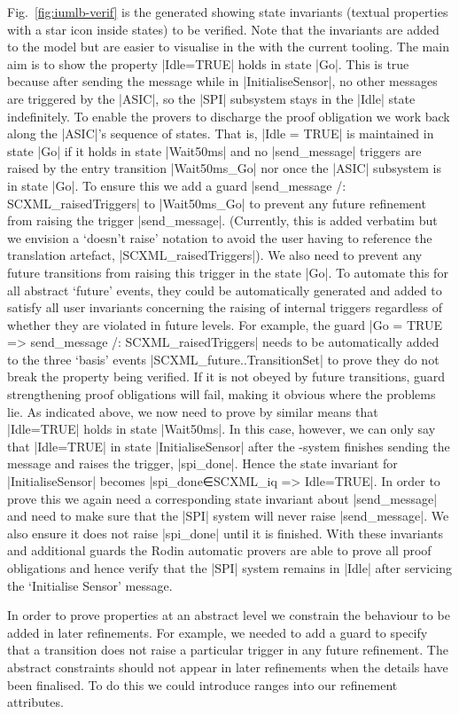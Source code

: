 Fig.~\ref{fig:iumlb-verif} is the generated \iUMLB showing state invariants (textual properties with a star icon inside states) to be verified. Note that the invariants are added to the \SCXML model but are easier to visualise in the \iUMLB with the current tooling.
The main aim is to show the property |Idle=TRUE| holds in state |Go|. 
This is true because after sending the message while in |InitialiseSensor|, no other messages are triggered by the |ASIC|, so the |SPI| subsystem stays in the |Idle| state indefinitely. 
To enable the provers to discharge the proof obligation we work back along the |ASIC|'s sequence of states. 
That is, |Idle = TRUE| is maintained in state |Go| if it holds in state |Wait50ms| and no |send_message| triggers are raised by the entry transition |Wait50ms_Go| nor once the |ASIC| subsystem is in state |Go|. 
To ensure this we add a guard |send_message /: SCXML_raisedTriggers| to |Wait50ms_Go| to prevent any future refinement from raising the trigger |send_message|.
(Currently, this is added verbatim but we envision a `doesn't raise' notation to avoid the user having to reference the translation artefact, |SCXML_raisedTriggers|).
We also need to prevent any future transitions from raising this trigger in the state |Go|.
To automate this for all abstract `future' events, they could be automatically generated and added to satisfy all user invariants concerning the raising of internal triggers regardless of whether they are violated in future levels. 
For example, the guard  |Go = TRUE => send_message /: SCXML_raisedTriggers| needs to be automatically added to the three `basis' events |SCXML_future..TransitionSet| to prove they do not break the property being verified. 
If it is not obeyed by future transitions, guard strengthening proof obligations will fail, making it obvious where the problems lie.
As indicated above, we now need to prove by similar means that |Idle=TRUE| holds in state |Wait50ms|. 
In this case, however, we can only say that |Idle=TRUE| in state |InitialiseSensor| after the \SPI-system finishes sending the message and raises the trigger, |spi_done|. 
Hence the state invariant for |InitialiseSensor| becomes |spi_done∈SCXML_iq => Idle=TRUE|. 
In order to prove this we again need a corresponding state invariant about |send_message| and need to make sure that the |SPI| system will never raise |send_message|.
We also ensure it does not raise |spi_done| until it is finished. 
With these invariants and additional guards the Rodin automatic provers are able to prove all proof obligations and hence verify that the |SPI| system remains in |Idle| after servicing the `Initialise Sensor' message.

In order to prove properties at an abstract level we constrain the behaviour to be added in later refinements. 
For example, we needed to add a guard to specify that a transition does not raise a particular trigger in any future refinement. 
The abstract constraints should not appear in later refinements when the details have been finalised. To do this we could introduce ranges into our refinement attributes.

